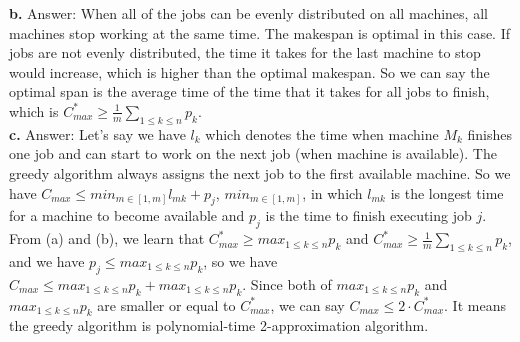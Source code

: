 \documentclass{article}
\begin{document}
\textbf{b.}
Answer: When all of the jobs can be evenly distributed on all machines, all machines stop working at the same time. The makespan is optimal in this case. If jobs are not evenly distributed, the time it takes for the last machine to stop would increase, which is higher than the optimal makespan. So we can say the optimal span is the average time of the time that it takes for all jobs to finish, which is $C_{max}^{*} \geq \frac{1}{m} \sum_{1\leq k \leq n}p_k$. \\ \newline
\textbf{c.}
Answer: Let's say we have $l_k$ which denotes the time when machine $M_k$ finishes one job and can start to work on the next job (when machine is available). The greedy algorithm always assigns the next job to the first available machine. So we have $C_{max} \leq min_{m\in[1, m]}l_{mk} + p_j$, $min_{m\in[1, m]}$, in which $l_{mk}$ is the longest time for a machine to become available and $p_j$ is the time to finish executing job $j$. From (a) and (b), we learn that $C_{max}^{*} \geq max_{1\leq k \leq n}p_k$ and $C_{max}^{*} \geq \frac{1}{m} \sum_{1\leq k \leq n}p_k$, and we have $p_j \leq max_{1\leq k \leq n}p_k$, so we have $C_{max} \leq max_{1\leq k \leq n}p_k + max_{1\leq k \leq n}p_k$. Since both of $max_{1\leq k \leq n}p_k$ and $max_{1\leq k \leq n}p_k$ are smaller or equal to $C_{max}^{*}$, we can say $C_{max} \leq 2\cdot C_{max}^{*}$. It means the greedy algorithm is polynomial-time 2-approximation algorithm.
\end{document}
